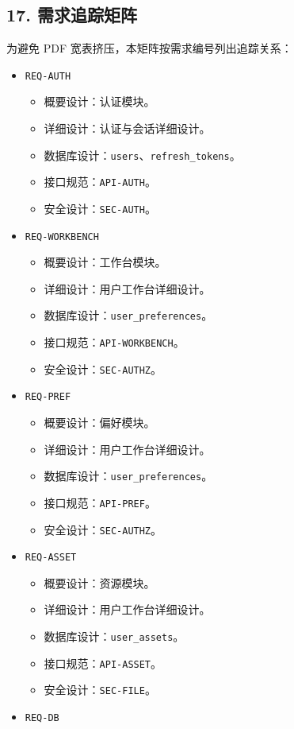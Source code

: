 \documentclass[
  a4paper,
  UTF8]{ctexart}
\providecommand{\tightlist}{%
  \setlength{\itemsep}{0pt}\setlength{\parskip}{0pt}}
\begin{document}
\hypertarget{ux9700ux6c42ux8ffdux8e2aux77e9ux9635}{%
\subsection{17.
需求追踪矩阵}\label{ux9700ux6c42ux8ffdux8e2aux77e9ux9635}}

为避免 PDF 宽表挤压，本矩阵按需求编号列出追踪关系：

\begin{itemize}
\tightlist
\item
  \texttt{REQ-AUTH}

  \begin{itemize}
  \tightlist
  \item
    概要设计：认证模块。
  \item
    详细设计：认证与会话详细设计。
  \item
    数据库设计：\texttt{users}、\texttt{refresh\_tokens}。
  \item
    接口规范：\texttt{API-AUTH}。
  \item
    安全设计：\texttt{SEC-AUTH}。
  \end{itemize}
\item
  \texttt{REQ-WORKBENCH}

  \begin{itemize}
  \tightlist
  \item
    概要设计：工作台模块。
  \item
    详细设计：用户工作台详细设计。
  \item
    数据库设计：\texttt{user\_preferences}。
  \item
    接口规范：\texttt{API-WORKBENCH}。
  \item
    安全设计：\texttt{SEC-AUTHZ}。
  \end{itemize}
\item
  \texttt{REQ-PREF}

  \begin{itemize}
  \tightlist
  \item
    概要设计：偏好模块。
  \item
    详细设计：用户工作台详细设计。
  \item
    数据库设计：\texttt{user\_preferences}。
  \item
    接口规范：\texttt{API-PREF}。
  \item
    安全设计：\texttt{SEC-AUTHZ}。
  \end{itemize}
\item
  \texttt{REQ-ASSET}

  \begin{itemize}
  \tightlist
  \item
    概要设计：资源模块。
  \item
    详细设计：用户工作台详细设计。
  \item
    数据库设计：\texttt{user\_assets}。
  \item
    接口规范：\texttt{API-ASSET}。
  \item
    安全设计：\texttt{SEC-FILE}。
  \end{itemize}
\item
  \texttt{REQ-DB}


\end{itemize}
\end{document}

